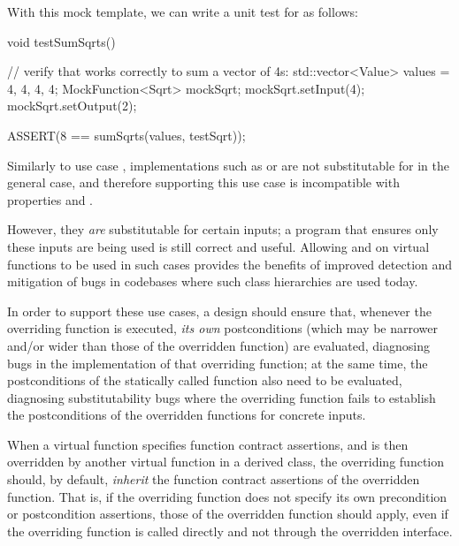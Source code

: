 With this mock template, we can write a unit test for  as follows:

\begin{codeblock}
void testSumSqrts() {
  // verify that  works correctly to sum a vector of 4s:
  std::vector<Value> values = {4, 4, 4, 4};
  MockFunction<Sqrt> mockSqrt;
  mockSqrt.setInput({4});
  mockSqrt.setOutput({2});
  
  ASSERT(8 == sumSqrts(values, testSqrt));
}
\end{codeblock}

Similarly to use case , implementations such as  or  are not substitutable for  in the general case, and therefore supporting this use case is incompatible with properties  and .

However, they \emph{are} substitutable for certain inputs; a program that ensures only these inputs are being used is still correct and useful. Allowing  and  on virtual functions to be used in such cases provides the benefits of improved detection and mitigation of bugs in codebases where such class hierarchies are used today.

In order to support these use cases, a design should ensure that, whenever the overriding function is executed, \emph{its own} postconditions (which may be narrower and/or wider than those of the overridden function) are evaluated, diagnosing bugs in the implementation of that overriding function; at the same time, the postconditions of the statically called function also need to be evaluated, diagnosing substitutability bugs where the overriding function fails to establish the postconditions of the overridden functions for concrete inputs.


When a virtual function specifies function contract assertions, and is then overridden by another virtual function in a derived class, the overriding function should, by default, \emph{inherit} the function contract assertions of the overridden function. That is, if the overriding function does not specify its own precondition or postcondition assertions, those of the overridden function should apply, even if the overriding function is called directly and not through the overridden interface.

